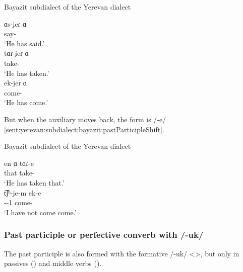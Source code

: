 \begin{exe}
	\ex Bayazit subdialect of the Yerevan dialect \label{sent:yerevan:subdialect:bayazit:pastParticiple}
	\begin{xlist}
		\ex \gll ɑs-i̯eɾ ɑ \\
		say-{\perfcvb} {\aux} \\
		\trans `He has said.' \\
		\ex \gll tɑɾ-i̯eɾ ɑ \\
		take-{\perfcvb} {\aux} \\
		\trans `He has taken.' \\
		\ex \gll ek-i̯eɾ ɑ \\
		come-{\perfcvb} {\aux} \\
		\trans `He has come.' \\
	\end{xlist}
\end{exe}


But when the auxiliary moves back, the form is /-e/ \ref{sent:yerevan:subdialect:bayazit:pastParticipleShift}.

\begin{exe}
	\ex Bayazit subdialect of the Yerevan dialect \label{sent:yerevan:subdialect:bayazit:pastParticipleShift}
	\begin{xlist} 
		\ex \gll en ɑ tɑɾ-e   \\
		that {\aux} take-{\perfcvb}\\
		\trans `He has taken that.' \\
		\armenian{էն ա տարէ}
		\ex \gll t͡ʃʰ-i̯e-m ek-e \\
		{\neggloss}-{\aux}-1{\sg} come-{\perfcvb} \\
		\trans `I have not come come.' \\
		\armenian{չեմ էկէ}
	\end{xlist}
\end{exe}

\subsubsection{Past participle or perfective converb with /-uk/} 

The past participle is also formed with the formative /-uk/ <>, but only in passives () and middle verbs (). 




